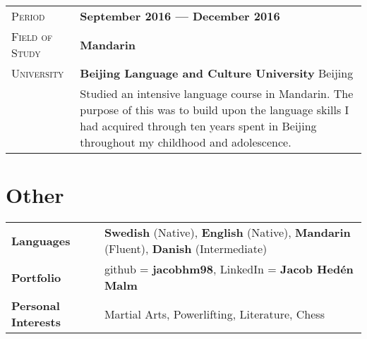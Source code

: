 \documentclass[a4paper, oneside, final]{scrartcl} %
\newcommand{\gray}{\rowcolor[gray]{.90}} %
\begin{document}
\begin{center}
\vspace{12pt}

\begin{tabularx}{0.97\linewidth}{>{\raggedleft\scshape}p{2cm}X}
\gray Period & \textbf{September 2016 ---  December 2016}\\
\gray Field of Study & \textbf{Mandarin}\\
\gray University & \textbf{Beijing Language and Culture University} \hfill Beijing\\
& Studied an intensive language course in Mandarin. The purpose of this was to build upon the language skills I had acquired through ten years spent in Beijing throughout my childhood and adolescence.
\end{tabularx}



\section{Other}

\begin{tabular}{ @{} >{\bfseries}l @{\hspace{6ex}} l }
Languages & \textbf{Swedish} (Native), \textbf{English} (Native), \textbf{Mandarin} (Fluent), \textbf{Danish} (Intermediate)\\
Portfolio & github = \textbf{jacobhm98},  LinkedIn = \textbf{Jacob Hedén Malm}\\
Personal Interests & Martial Arts, Powerlifting, Literature, Chess

\end{tabular}

\end{center}
\end{document}
